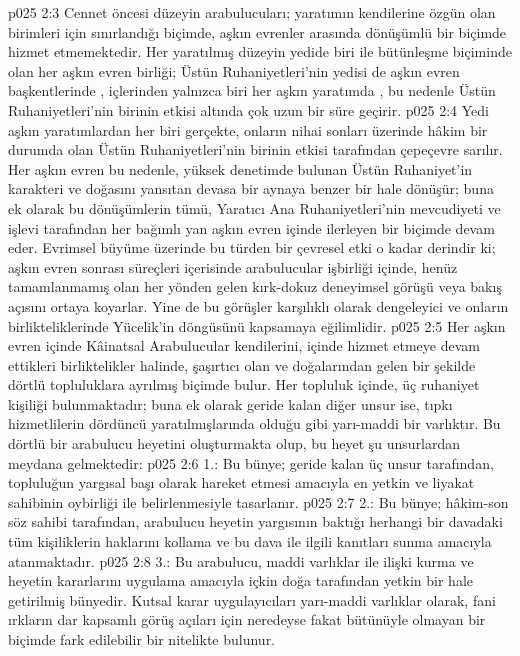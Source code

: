 \vs p025 2:3 Cennet öncesi düzeyin arabulucuları; yaratımın kendilerine özgün olan birimleri için sınırlandığı biçimde, aşkın evrenler arasında dönüşümlü bir biçimde hizmet etmemektedir. Her yaratılmış düzeyin yedide biri ile bütünleşme biçiminde olan her aşkın evren birliği; Üstün Ruhaniyetleri’nin yedisi de aşkın evren başkentlerinde , içlerinden yalnızca biri her aşkın yaratımda , bu nedenle Üstün Ruhaniyetleri’nin birinin etkisi altında çok uzun bir süre geçirir.
\vs p025 2:4 Yedi aşkın yaratımlardan her biri gerçekte, onların nihai sonları üzerinde hâkim bir durumda olan Üstün Ruhaniyetleri’nin birinin etkisi tarafından çepeçevre sarılır. Her aşkın evren bu nedenle, yüksek denetimde bulunan Üstün Ruhaniyet’in karakteri ve doğasını yansıtan devasa bir aynaya benzer bir hale dönüşür; buna ek olarak bu dönüşümlerin tümü, Yaratıcı Ana Ruhaniyetleri’nin mevcudiyeti ve işlevi tarafından her bağımlı yan aşkın evren içinde ilerleyen bir biçimde devam eder. Evrimsel büyüme üzerinde bu türden bir çevresel etki o kadar derindir ki; aşkın evren sonrası süreçleri içerisinde arabulucular işbirliği içinde, henüz tamamlanmamış olan her yönden gelen kırk\hyp{}dokuz deneyimsel görüşü veya bakış açısını ortaya koyarlar. Yine de bu görüşler karşılıklı olarak dengeleyici ve onların birlikteliklerinde Yücelik’in döngüsünü kapsamaya eğilimlidir.
\vs p025 2:5 Her aşkın evren içinde Kâinatsal Arabulucular kendilerini, içinde hizmet etmeye devam ettikleri birliktelikler halinde, şaşırtıcı olan ve doğalarından gelen bir şekilde dörtlü topluluklara ayrılmış biçimde bulur. Her topluluk içinde, üç ruhaniyet kişiliği bulunmaktadır; buna ek olarak geride kalan diğer unsur ise, tıpkı hizmetlilerin dördüncü yaratılmışlarında olduğu gibi yarı\hyp{}maddi bir varlıktır. Bu dörtlü bir arabulucu heyetini oluşturmakta olup, bu heyet şu unsurlardan meydana gelmektedir:
\vs p025 2:6 1.\bibnobreakspace {}: Bu bünye; geride kalan üç unsur tarafından, topluluğun yargısal başı olarak hareket etmesi amacıyla en yetkin ve liyakat sahibinin oybirliği ile belirlenmesiyle tasarlanır.
\vs p025 2:7 2.\bibnobreakspace {}: Bu bünye; hâkim\hyp{}son söz sahibi tarafından, arabulucu heyetin yargısının baktığı herhangi bir davadaki tüm kişiliklerin haklarını kollama ve bu dava ile ilgili kanıtları sunma amacıyla atanmaktadır.
\vs p025 2:8 3.\bibnobreakspace {}: Bu arabulucu, maddi varlıklar ile ilişki kurma ve heyetin kararlarını uygulama amacıyla içkin doğa tarafından yetkin bir hale getirilmiş bünyedir. Kutsal karar uygulayıcıları yarı\hyp{}maddi varlıklar olarak, fani ırkların dar kapsamlı görüş açıları için neredeyse fakat bütünüyle olmayan bir biçimde fark edilebilir bir nitelikte bulunur.
